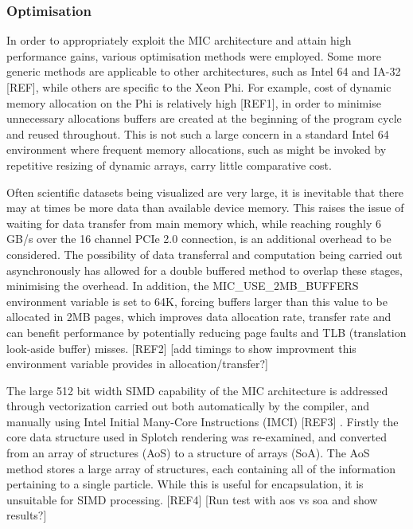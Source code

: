 \documentclass{easychair}
\begin{document}
\subsubsection{Optimisation}
\label{sect:micoptimisation}

In order to appropriately exploit the MIC architecture and attain high performance gains, various optimisation methods 
were employed. Some more generic methods are applicable to other architectures, such as Intel 64 and IA-32 [REF], while 
others are specific to the Xeon Phi. For example, cost of dynamic memory allocation on the Phi is relatively high [REF1], 
in order to minimise unnecessary allocations buffers are created at the beginning of the program cycle and reused 
throughout. This is not such a large concern in a standard Intel 64 environment where frequent memory allocations, 
such as might be invoked by repetitive resizing of dynamic arrays, carry little comparative cost.

Often scientific datasets being visualized are very large, it is inevitable that there may at times be more data than 
available device memory. This raises the issue of waiting for data transfer from main memory which, while reaching 
roughly 6 GB/s over the 16 channel PCIe 2.0 connection, is an additional overhead to be considered. The possibility 
of data transferral and computation being carried out asynchronously has allowed for a double buffered method to 
overlap these stages, minimising the overhead. In addition, the MIC\_USE\_2MB\_BUFFERS environment variable is set 
to 64K, forcing buffers larger than this value to be allocated in 2MB pages, which improves data allocation rate, 
transfer rate and can benefit performance by potentially reducing page faults and TLB (translation look-aside buffer) 
misses. [REF2] [add timings to show improvment this environment variable provides in allocation/transfer?]

The large 512 bit width SIMD capability of the MIC architecture is addressed through vectorization carried out both 
automatically by the compiler, and manually using Intel Initial Many-Core Instructions (IMCI) [REF3] . Firstly the 
core data structure used in Splotch rendering was re-examined, and converted from an array of structures (AoS) to 
a structure of arrays (SoA). The AoS method stores a large array of structures, each containing all of the 
information pertaining to a single particle. While this is useful for encapsulation, it is unsuitable for SIMD 
processing. [REF4] [Run test with aos vs soa and show results?]
\end{document}
